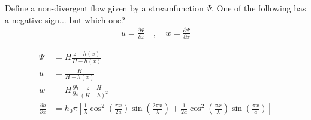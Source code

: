 Define a non-divergent flow given by a streamfunction $\Psi$.  One of the following has a negative sign... but which one?
\begin{align}
u = \frac{\partial \Psi}{\partial z} \quad,\quad w = \frac{\partial \Psi}{\partial x}
\end{align}

\begin{align}
\Psi &= H \frac{z - h(x)}{H - h(x)} \\
u &= \frac{H}{H - h(x)} \\
w &= H \frac{\partial h}{\partial x} \frac{z - H}{\left( H - h \right)^2} \\
\frac{\partial h}{\partial x} &= h_0 \pi \left[ 
	\frac{1}{\lambda} \cos^2 \left( \frac{\pi x}{2a} \right) \sin \left( \frac{2 \pi x}{\lambda} \right) +
	\frac{1}{2a} \cos^2 \left( \frac{\pi x}{\lambda} \right) \sin \left( \frac{\pi x}{a} \right)
\right]
\end{align}
